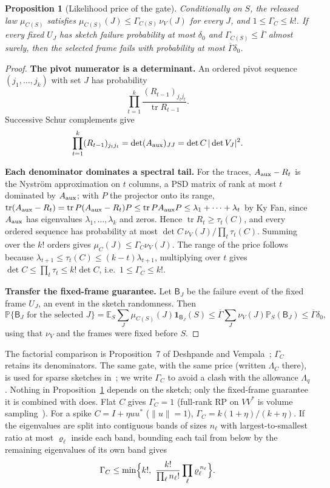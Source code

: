 \documentclass[11pt,a4paper]{article}
\newtheorem{proposition}[theorem]{Proposition}
\theoremstyle{definition}
\theoremstyle{remark}
\numberwithin{equation}{section}
\newcommand{\E}{\mathbb E}
\newcommand{\Prob}{\mathbb P}
\newcommand{\tr}{\operatorname{tr}}
\newcommand{\norm}[1]{\lVert#1\rVert}
\begin{document}
\begin{proposition}[Likelihood price of the gate]\label{prop:gate}
Conditionally on $S$, the released law $\mu_{C(S)}$ satisfies
$\mu_{C(S)}(J)\le\Gamma_{C(S)}\,\nu_V(J)$ for every $J$, and $1\le\Gamma_C\le k!$.
If every fixed $U_J$ has sketch failure probability at most $\delta_0$ and
$\Gamma_{C(S)}\le\overline\Gamma$ almost surely, then the selected frame fails
with probability at most $\overline\Gamma\delta_0$.
\end{proposition}
\begin{proof}
\noindent\textbf{The pivot numerator is a determinant.}\enspace
An ordered pivot sequence $(j_1,\dots,j_k)$ with set $J$ has probability
\[
 \prod_{t=1}^k\frac{(R_{t-1})_{j_tj_t}}{\tr R_{t-1}}.
\]
Successive Schur complements give
\[
 \prod_{t=1}^k(R_{t-1})_{j_tj_t}
 =\det(A_{\rm aux})_{JJ}
 =\det C\,|\det V_J|^2.
\]

\noindent\textbf{Each denominator dominates a spectral tail.}\enspace
For the traces,
$A_{\rm aux}-R_t$ is the Nystr\"om approximation on $t$ columns, a PSD matrix
of rank at most $t$ dominated by $A_{\rm aux}$; with $P$ the projector onto its
range, $\tr(A_{\rm aux}-R_t)=\tr P(A_{\rm aux}-R_t)P\le\tr PA_{\rm aux}P\le
\lambda_1+\dots+\lambda_t$ by Ky Fan, since $A_{\rm aux}$ has eigenvalues
$\lambda_1,\dots,\lambda_k$ and zeros. Hence $\tr R_t\ge\tau_t(C)$, and every
ordered sequence has probability at most $\det C\,\nu_V(J)/\prod_t\tau_t(C)$.
Summing over the $k!$ orders gives $\mu_C(J)\le\Gamma_C\nu_V(J)$.
The range of the price follows because
$\lambda_{t+1}\le\tau_t(C)\le(k-t)\lambda_{t+1}$, multiplying over $t$ gives
$\det C\le\prod_t\tau_t\le k!\det C$, i.e.\ $1\le\Gamma_C\le k!$.

\noindent\textbf{Transfer the fixed-frame guarantee.}\enspace
Let $\mathsf B_J$ be the failure event of the fixed frame $U_J$, an event in
the sketch randomness. Then
\[
 \Prob\{\mathsf B_J\text{ for the selected }J\}
 =\E_S\sum_J\mu_{C(S)}(J)\mathbf 1_{\mathsf B_J}(S)
 \le\overline\Gamma\sum_J\nu_V(J)\Prob_S(\mathsf B_J)\le\overline\Gamma\delta_0,
\]
using that $\nu_V$ and the frames were fixed before $S$.
\end{proof}

The factorial comparison is Proposition~7 of Deshpande and
Vempala~\cite{DV}; $\Gamma_C$ retains its denominators. The same gate, with
the same price (written $\Lambda_C$ there), is used for sparse sketches
in~\cite{SparseCompanion}; we write $\Gamma_C$ to avoid a clash with the
allowance $\Lambda_q$. Nothing in Proposition~\ref{prop:gate} depends on the
sketch; only the fixed-frame guarantee it is combined with does. Flat $C$ gives
$\Gamma_C=1$ (full-rank RP on $VV^*$ is volume sampling~\cite{DRVW}). For a
spike $C=I+\eta uu^*$ ($\norm u=1$), $\Gamma_C=k(1+\eta)/(k+\eta)$. If the
eigenvalues are split into contiguous bands of sizes $n_\ell$ with
largest-to-smallest ratio at most $\varrho_\ell$ inside each band, bounding each
tail from below by the remaining eigenvalues of its own band gives
\begin{equation}\label{eq:bands}
 \Gamma_C\le\min\Bigl\{k!,\ \frac{k!}{\prod_\ell n_\ell!}\prod_\ell\varrho_\ell^{\,n_\ell}\Bigr\}.
\end{equation}
\end{document}
